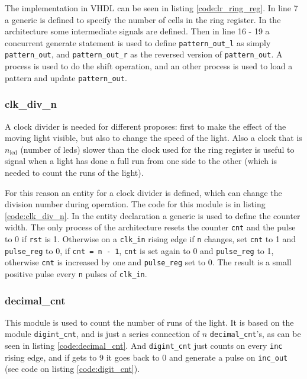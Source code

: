 \documentclass[12pt]{article}   	%
\begin{document}
The implementation  in VHDL can be seen in listing \ref{code:lr_ring_reg}. In line 7 a generic is defined to specify the number of cells in the ring register. In the architecture some intermediate signals are defined. Then in line 16 - 19 a concurrent generate statement is used to define \lstinline{pattern_out_l} as simply \lstinline{pattern_out}, and \lstinline{pattern_out_r} as the reversed version of \lstinline{pattern_out}. A process is used to do the shift operation, and an other process is used to load a pattern and update \lstinline{pattern_out}.

\subsubsection{clk\_div\_n}
A clock divider is needed for different proposes: first to make the effect of the moving light visible, but also to change the speed of the light. Also a clock that is $n_\text{led}$ (number of leds) slower than the clock used for the ring register is useful to signal when a light has done a full run from one side to the other (which is needed to count the runs of the light).

For this reason an entity for a clock divider is defined, which can change the division number during operation. The code for this module is in listing \ref{code:clk_div_n}. In the entity declaration a generic is used to define the counter width. The only process of the architecture resets the counter \lstinline{cnt} and the pulse to 0 if \lstinline{rst} is 1. Otherwise on a \lstinline{clk_in} rising edge if \lstinline{n} changes, set \lstinline{cnt} to 1 and \lstinline{pulse_reg} to 0, if \lstinline{cnt = n - 1}, \lstinline{cnt} is set again to 0 and \lstinline{pulse_reg} to 1, otherwise \lstinline{cnt} is increased by one and \lstinline{pulse_reg} set to 0. The result is a small positive pulse every \lstinline{n} pulses of \lstinline{clk_in}.

\subsubsection{decimal\_cnt}

This module is used to count the number of runs of the light. It is based on the module \lstinline{digint_cnt}, and is just a series connection of $n$ \lstinline{decimal_cnt}'s, as can be seen in listing \ref{code:decimal_cnt}. And \lstinline{digint_cnt} just counts on every \lstinline{inc} rising edge, and if gets to 9 it goes back to 0 and generate a pulse on \lstinline{inc_out} (see code on listing \ref{code:digit_cnt}).
\end{document}
